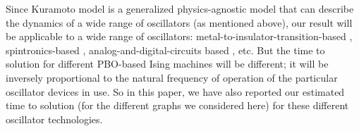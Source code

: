 \documentclass[%
 reprint,
 amsmath,amssymb,
 aps,
]{revtex4-2}
\begin{document}
Since Kuramoto model is a generalized physics-agnostic model that can describe the dynamics of a wide range of oscillators (as mentioned above), our result will be applicable to a wide range of oscillators: metal-to-insulator-transition-based \citep{MIT1,MIT2}, spintronics-based \citep{Spin_Akerman1,Spin_Liu,Spin_Finocchio1,Spin_Finocchio2}, analog-and-digital-circuits based \citep{Circuit1,Circuit2,Circuit3,Circuit4,Circuit5}, etc. But the time to solution for different PBO-based Ising machines will be different; it will be inversely proportional to the natural frequency of operation of the particular oscillator devices in use. So in this paper, we have also reported our estimated time to solution (for the different graphs we considered here) for these different oscillator technologies. 






\end{document}
